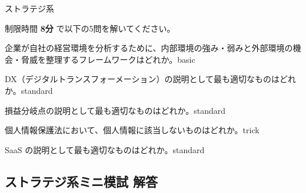 \mondaipage
\begin{minimoshi}{ストラテジ系}

制限時間 \textbf{8分} で以下の5問を解いてください。

\begin{mondai}{企業が自社の経営環境を分析するために、内部環境の強み・弱みと外部環境の機会・脅威を整理するフレームワークはどれか。}{basic}
\end{mondai}

\begin{mondai}{DX（デジタルトランスフォーメーション）の説明として最も適切なものはどれか。}{standard}
\end{mondai}

\begin{mondai}{損益分岐点の説明として最も適切なものはどれか。}{standard}
\end{mondai}

\begin{mondai}{個人情報保護法において、個人情報に該当しないものはどれか。}{trick}
\end{mondai}

\begin{mondai}{SaaS の説明として最も適切なものはどれか。}{standard}
\end{mondai}

\end{minimoshi}

\kaitoupage
\subsection*{ストラテジ系ミニ模試 解答}

